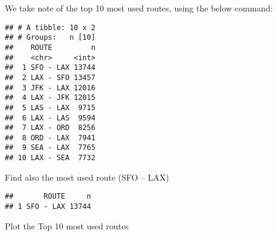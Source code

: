 \documentclass[]{article}
\newenvironment{Shaded}{\begin{snugshade}}{\end{snugshade}}
\newcommand{\CharTok}[1]{\textcolor[rgb]{0.31,0.60,0.02}{#1}}
\newcommand{\DataTypeTok}[1]{\textcolor[rgb]{0.13,0.29,0.53}{#1}}
\newcommand{\DecValTok}[1]{\textcolor[rgb]{0.00,0.00,0.81}{#1}}
\newcommand{\KeywordTok}[1]{\textcolor[rgb]{0.13,0.29,0.53}{\textbf{#1}}}
\newcommand{\NormalTok}[1]{#1}
\newcommand{\OperatorTok}[1]{\textcolor[rgb]{0.81,0.36,0.00}{\textbf{#1}}}
\newcommand{\StringTok}[1]{\textcolor[rgb]{0.31,0.60,0.02}{#1}}
\begin{document}
We take note of the top 10 most used routes, using the below command:

\begin{Shaded}
\end{Shaded}

\begin{verbatim}
## # A tibble: 10 x 2
## # Groups:   n [10]
##    ROUTE         n
##    <chr>     <int>
##  1 SFO - LAX 13744
##  2 LAX - SFO 13457
##  3 JFK - LAX 12016
##  4 LAX - JFK 12015
##  5 LAS - LAX  9715
##  6 LAX - LAS  9594
##  7 LAX - ORD  8256
##  8 ORD - LAX  7941
##  9 SEA - LAX  7765
## 10 LAX - SEA  7732
\end{verbatim}

Find also the most used route (SFO -- LAX)

\begin{Shaded}
\end{Shaded}

\begin{verbatim}
##       ROUTE     n
## 1 SFO - LAX 13744
\end{verbatim}

Plot the Top 10 most used routes

\begin{Shaded}
\end{Shaded}
\end{document}
